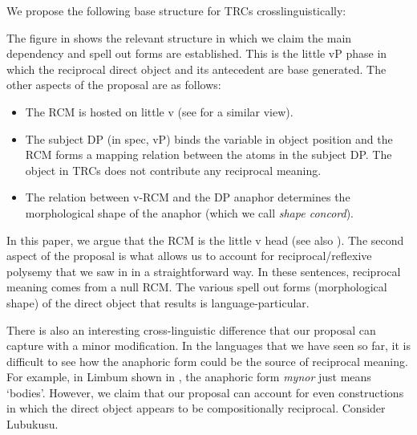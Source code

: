 \documentclass[output=paper]{langsci/langscibook}
\begin{document}
We propose the following base structure for TRCs crosslinguistically:

 

\begin{figure}
\end{figure}

 



The figure in  shows the relevant structure in which we claim the main dependency and spell out forms are established. This is the little vP phase in which the reciprocal direct object and its antecedent are base generated. The other aspects of the proposal are as follows:


\begin{itemize}
\item The RCM is hosted on little v (see \citealt{Bruening2006} for a similar view).

\item The subject DP (in spec, vP) binds the variable in object position and the RCM forms a mapping relation between the atoms in the subject DP. The object in TRCs does not contribute any reciprocal meaning.

\item The relation between v-RCM and the DP anaphor determines the morphological shape of the anaphor (which we call \textit{shape concord}).

\end{itemize}

In this paper, we argue that the RCM is the little v head (see also \citealt{BakerEtAl2013}). The second aspect of the proposal is what allows us to account for reciprocal/reflexive polysemy that we saw in  in a straightforward way. In these sentences, reciprocal meaning comes from a null RCM. The various spell out forms (morphological shape) of the direct object that results is language-particular. 

There is also an interesting cross-linguistic difference that our proposal can capture with a minor modification. In the languages that we have seen so far, it is difficult to see how the anaphoric form could be the source of reciprocal meaning. For example, in Limbum shown in , the anaphoric form \textit{mynor} just means ‘bodies’. However, we claim that our proposal can account for even constructions in which the direct object appears to be compositionally reciprocal. Consider Lubukusu.
\end{document}
